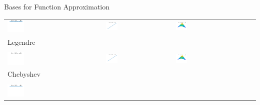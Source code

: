 \documentclass[10pt,compress,xcolor={usenames,dvipsnames},aspectratio=169]{beamer}
\begin{document}
\begin{frame}{Bases for Function Approximation}
\vspace{-3ex}
	\begin{tabular}{>{\centering}m{}>{\centering}m{}>{\centering}m{}>{\centering}m{}>{\centering}m{}}
		\includegraphics[width =0.18\textwidth]{ProgramsImages/Legendre_Degree_0_k.png}  &
		\includegraphics[width =0.18\textwidth]{ProgramsImages/Legendre_Degree_1_k.png}  &
		\includegraphics[width =0.18\textwidth]{ProgramsImages/Legendre_Degree_1_1_k.png}
		\tabularnewline[-7ex]
	Legendre
	\tabularnewline
\tabularnewline[3ex]
		\includegraphics[width =0.18\textwidth]{ProgramsImages/Chebyshev_Degree_0_k.png}  &
\includegraphics[width =0.18\textwidth]{ProgramsImages/Chebyshev_Degree_1_k.png}  &
\includegraphics[width =0.18\textwidth]{ProgramsImages/Chebyshev_Degree_1_1_k.png}  
\tabularnewline[-7ex]
Chebyshev
\tabularnewline
\tabularnewline[3ex]
		\includegraphics[width =0.18\textwidth]{ProgramsImages/Chebyshev_Degree_0_k.png}  &

\end{tabular}
\end{frame}
\end{document}
